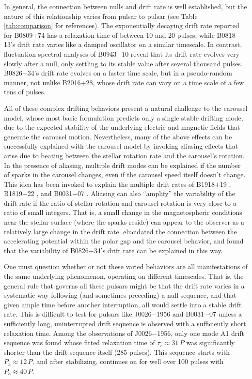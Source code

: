 \documentclass[linenumbers]{aastex631}
\newcommand{\psr}{J0026$-$1956}
\begin{document}
In general, the connection between nulls and drift rate is well established, but the nature of this relationship varies from pulsar to pulsar (see Table \ref{tab:comparison} for references).
The exponentially decaying drift rate reported for B0809$+$74 has a relaxation time of between 10 and 20 pulses, while B0818$-$13's drift rate varies like a damped oscillator on a similar timescale.
In contrast, fluctuation spectral analyses of B0943$+$10 reveal that its drift rate evolves very slowly after a null, only settling to its stable value after several thousand pulses.
B0826$-$34's drift rate evolves on a faster time scale, but in a pseudo-random manner, not unlike B2016$+$28, whose drift rate can vary on a time scale of a few tens of pulses.

All of these complex drifting behaviors present a natural challenge to the carousel model, whose most basic formulation predicts only a single stable drifting mode, due to the expected stability of the underlying electric and magnetic fields that generate the carousel motion.
Nevertheless, many of the above effects can be successfully explained with the carousel model by invoking aliasing effects that arise due to beating between the stellar rotation rate and the carousel's rotation.
In the presence of aliasing, multiple drift modes can be explained if the number of sparks in the carousel changes, even if the carousel speed itself doesn't change.
This idea has been invoked to explain the multiple drift rates of B1918$+$19 \citep{Rankin2013}, B1819$-$22 \citep{Joshi2017,Janagal2022}, and B0031$-$07 \citep{McSweeney2019a}.
Aliasing can also ``amplify'' the variability of the drift rate if the ratio of stellar rotation and carousel rotation is very close to a ratio of small integers.
That is, a small change in the magnetospheric conditions near the stellar surface (where the sparks reside) can appear to the observer as a relatively large change in the drift rate.
\citet{VanLeeuwen2012} elucidated the connection between the accelerating potential within the polar gap and the carousel behavior, and found that the variability of B0826$-$34's drift rate can be explained in this way.

One must question whether or not these varied behaviors are all manifestations of the same underlying phenomenon, operating on different timescales.
That is, the general rule that governs all these pulsars might be that the drift rate varies in a systematic way following (and sometimes preceding) a null sequence, and that given ample time before another interruption, all would settle into a stable drift rate.
This is difficult to test for pulsars like \psr{} and B0031$-$07 unless a sufficiently long, uninterrupted drift sequence is observed with a sufficiently short relaxation time.
Among the observations of \psr{}, only one mode A1 drift sequence was found whose fitted relaxation time of $\tau_r \approx 31\,P$ was significantly shorter than the drift sequence itself (285 pulses).
This sequence starts with $P_3 \approx 12\,P$, and after stabilizing, continues on for well over 100 pulses with $P_3 \approx 40\,P$.
\end{document}
